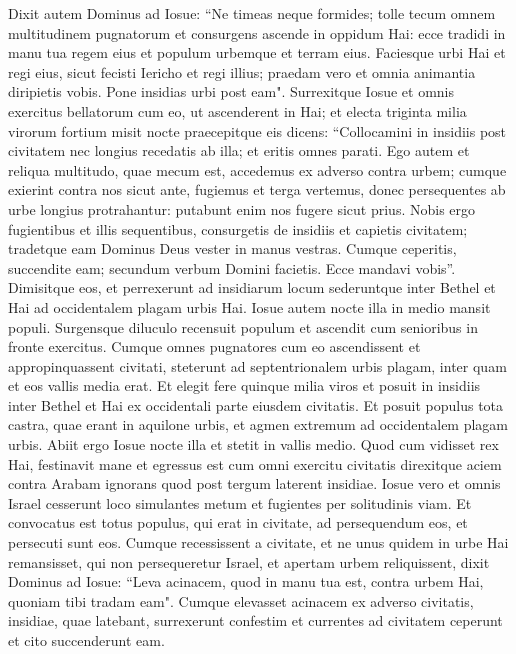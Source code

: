 \begin{biblechapter}  
\verse Dixit autem Dominus ad Iosue: “Ne timeas neque formides; tolle tecum omnem multitudinem pugnatorum et consurgens ascende in oppidum Hai: ecce tradidi in manu tua regem eius et populum urbemque et terram eius. 
\verse Faciesque urbi Hai et regi eius, sicut fecisti Iericho et regi illius; praedam vero et omnia animantia diripietis vobis. Pone insidias urbi post eam". 
\verse Surrexitque Iosue et omnis exercitus bellatorum cum eo, ut ascenderent in Hai; et electa triginta milia virorum fortium misit nocte 
\verse praecepitque eis dicens: “Collocamini in insidiis post civitatem nec longius recedatis ab illa; et eritis omnes parati. 
\verse Ego autem et reliqua multitudo, quae mecum est, accedemus ex adverso contra urbem; cumque exierint contra nos sicut ante, fugiemus et terga vertemus, 
\verse donec persequentes ab urbe longius protrahantur: putabunt enim nos fugere sicut prius. 
\verse Nobis ergo fugientibus et illis sequentibus, consurgetis de insidiis et capietis civitatem; tradetque eam Dominus Deus vester in manus vestras. 
\verse Cumque ceperitis, succendite eam; secundum verbum Domini facietis. Ecce mandavi vobis”. 
\verse Dimisitque eos, et perrexerunt ad insidiarum locum sederuntque inter Bethel et Hai ad occidentalem plagam urbis Hai. Iosue autem nocte illa in medio mansit populi. 
\verse Surgensque diluculo recensuit populum et ascendit cum senioribus in fronte exercitus. 
\verse Cumque omnes pugnatores cum eo ascendissent et appropinquassent civitati, steterunt ad septentrionalem urbis plagam, inter quam et eos vallis media erat. 
\verse Et elegit fere quinque milia viros et posuit in insidiis inter Bethel et Hai ex occidentali parte eiusdem civitatis. 
\verse Et posuit populus tota castra, quae erant in aquilone urbis, et agmen extremum ad occidentalem plagam urbis. Abiit ergo Iosue nocte illa et stetit in vallis medio. 
\verse Quod cum vidisset rex Hai, festinavit mane et egressus est cum omni exercitu civitatis direxitque aciem contra Arabam ignorans quod post tergum laterent insidiae. 
\verse Iosue vero et omnis Israel cesserunt loco simulantes metum et fugientes per solitudinis viam. 
\verse Et convocatus est totus populus, qui erat in civitate, ad persequendum eos, et persecuti sunt eos. Cumque recessissent a civitate, 
\verse et ne unus quidem in urbe Hai remansisset, qui non persequeretur Israel, et apertam urbem reliquissent, 
\verse dixit Dominus ad Iosue: “Leva acinacem, quod in manu tua est, contra urbem Hai, quoniam tibi tradam eam". 
\verse Cumque elevasset acinacem ex adverso civitatis, insidiae, quae latebant, surrexerunt confestim et currentes ad civitatem ceperunt et cito succenderunt eam. 

\end{biblechapter}
